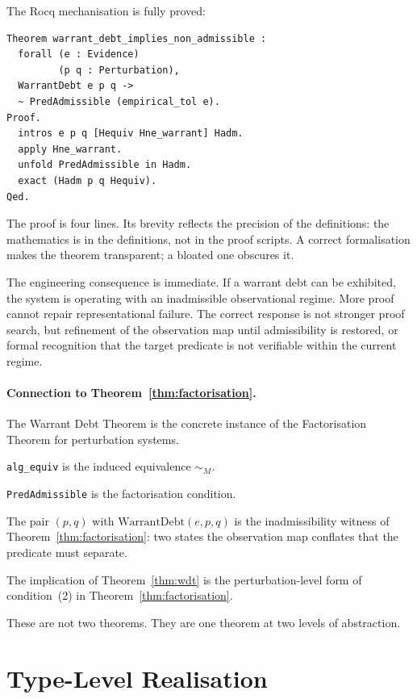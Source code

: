 \documentclass[12pt]{article}
\theoremstyle{plain}
\theoremstyle{definition}
\theoremstyle{remark}
\newcommand{\WD}{\mathrm{WarrantDebt}}
\begin{document}
The Rocq mechanisation is fully proved:

\begin{lstlisting}[style=rocq,
caption={Warrant Debt Theorem, fully proved in Rocq.}]
Theorem warrant_debt_implies_non_admissible :
  forall (e : Evidence)
         (p q : Perturbation),
  WarrantDebt e p q ->
  ~ PredAdmissible (empirical_tol e).
Proof.
  intros e p q [Hequiv Hne_warrant] Hadm.
  apply Hne_warrant.
  unfold PredAdmissible in Hadm.
  exact (Hadm p q Hequiv).
Qed.
\end{lstlisting}

The proof is four lines.
Its brevity reflects the precision of the definitions: the mathematics
is in the definitions, not in the proof scripts.
A correct formalisation makes the theorem transparent; a bloated one
obscures it.

The engineering consequence is immediate.
If a warrant debt can be exhibited, the system is operating with an
inadmissible observational regime.
More proof cannot repair representational failure.
The correct response is not stronger proof search, but refinement of
the observation map until admissibility is restored, or formal
recognition that the target predicate is not verifiable within the
current regime.

\paragraph{Connection to Theorem~\ref{thm:factorisation}.}

The Warrant Debt Theorem is the concrete instance of the Factorisation
Theorem for perturbation systems.

\texttt{alg\_equiv} is the induced equivalence $\sim_M$.

\texttt{PredAdmissible} is the factorisation condition.

The pair $(p,q)$ with $\WD(e,p,q)$ is the inadmissibility witness of
Theorem~\ref{thm:factorisation}: two states the observation map
conflates that the predicate must separate.

The implication of Theorem~\ref{thm:wdt} is the perturbation-level
form of condition~(2) in Theorem~\ref{thm:factorisation}.

These are not two theorems.
They are one theorem at two levels of abstraction.

\section{Type-Level Realisation}
\label{sec:type}
\end{document}
